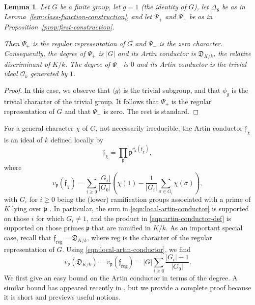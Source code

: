 \documentclass[12pt]{amsart}
\newtheorem{lemma}[theorem]{Lemma}
\theoremstyle{definition} \newtheorem{definition}[theorem]{Definition}
\theoremstyle{example} \newtheorem{example}[theorem]{Example}
\theoremstyle{remark} \newtheorem{remark}{Remark}[theorem]
\numberwithin{equation}{section}
\numberwithin{theorem}{section}
\renewcommand{\geq}{\geqslant}
\begin{document}
	\begin{lemma} \label{lem:identity-class}
		Let $G$ be a finite group, let $g=1$ (the identity of $G$), let $\Delta_g$ be as in Lemma~\ref{lem:class-function-construction}, and let $\Psi_+$ and $\Psi_-$ be as in Proposition~\ref{prop:first-construction}.
		
		Then $\Psi_+$ is the regular representation of $G$ and $\Psi_-$ is the zero character.  Consequently, the degree of $\Psi_+$ is $|G|$ and its Artin conductor is $\mathfrak{D}_{K/k}$, the relative discriminant of $K/k$.  The degree of $\Psi_-$ is $0$ and its Artin conductor is the trivial ideal $\mathcal{O}_k$ generated by $1$. 
	\end{lemma}
	\begin{proof}
		In this case, we observe that $\langle g \rangle$ is the trivial subgroup, and that $\phi_g$ is the trivial character of the trivial group.  It follows that $\Psi_+$ is the regular representation of $G$ and that $\Psi_-$ is zero.  The rest is standard.
	\end{proof}

	For a general character $\chi$ of $G$, not necessarily irreducible, the Artin conductor $\mathfrak{f}_\chi$ is an ideal of $k$ defined locally by
		\begin{equation} \label{eqn:artin-conductor-def}
			\mathfrak{f}_\chi 
				= \prod_{\mathfrak{p}} \mathfrak{p}^{v_\mathfrak{p}(\mathfrak{f}_\chi)},
		\end{equation}
	where
		\begin{equation} \label{eqn:local-artin-conductor}
			v_\mathfrak{p}(\mathfrak{f}_\chi) = \sum_{i \geq 0} \frac{|G_i|}{|G_0|} \left(\chi(1) - \frac{1}{|G_i|} \sum_{\sigma \in G_i} \chi(\sigma)\right),
		\end{equation}
	with $G_i$ for $i \geq 0$ being the (lower) ramification groups associated with a prime of $K$ lying over $\mathfrak{p}$ \cite[VI \S 2 Corollary 1]{Serre-LocalFields}.  In particular, the sum in \eqref{eqn:local-artin-conductor} is supported on those $i$ for which $G_i \ne 1$, and the product in \eqref{eqn:artin-conductor-def} is supported on those primes $\mathfrak{p}$ that are ramified in $K/k$.  As an important special case, recall that $\mathfrak{f}_\mathrm{reg} = \mathfrak{D}_{K/k}$, where $\mathrm{reg}$ is the character of the regular representation of $G$.  Using \eqref{eqn:local-artin-conductor}, we find
			\begin{equation} \label{eqn:disc-val}
				v_\mathfrak{p}(\mathfrak{D}_{K/k}) 
					= v_\mathfrak{p}(\mathfrak{f}_\mathrm{reg})
					= |G| \sum_{i \geq 0} \frac{|G_i|-1}{|G_0|}.
			\end{equation}	
	We first give an easy bound on the Artin conductor in terms of the degree.  A similar bound has appeared recently in \cite[Lemma 4.2]{FiorilliJouve}, but we provide a complete proof because it is short and previews useful notions.
\end{document}
